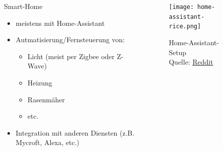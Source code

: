 \documentclass[
    ngerman,
    accentcolor=3b,
    fontsize= 12pt,
    a4paper,
    aspectratio=169,
    colorback=true,
    fancy_row_colors,
    leqno,
    fleqn,
    boxarc=3pt,
    fleqn,
    main,
    design=2008,
]{algoslides}
\begin{document}
    \begin{frame}
        \slidehead{}
        \begin{columns}[T]
            \begin{column}{.5\textwidth}
                Smart-Home
                \begin{itemize}
                    \item meistens mit Home-Assistant
                    \item Autmatisierung/Fernsteuerung von:
                        \begin{itemize}
                            \item Licht (meist per Zigbee oder Z-Wave)
                            \item Heizung
                            \item Rasenmäher
                            \item etc.
                        \end{itemize}
                    \item Integration mit anderen Diensten (z.B. Mycroft, Alexa, etc.)
                \end{itemize}
            \end{column}%
            \begin{column}{.5\textwidth}
                \begin{figure}[ht!]
                    \centering
                    \texttt{[image: home-assistant-rice.png]}
                    \caption{Home-Assistant-Setup\\Quelle: \href{https://www.reddit.com/r/homeassistant/comments/1ftdstl/my_50_inches_family_dashoboard/}{Reddit}}
                    \label{fig:home-assistant}

                \end{figure}
            \end{column}%
        \end{columns}
    \end{frame}
\end{document}
